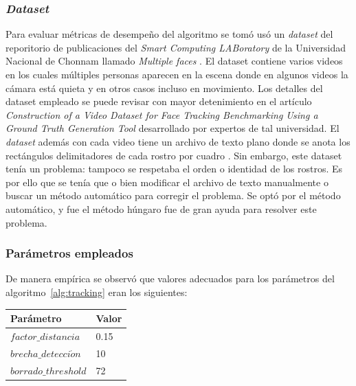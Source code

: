 \documentclass[a4paper,openright,12pt]{report}
\begin{document}
\subsubsection{\textit{Dataset}}
Para evaluar métricas de desempeño del algoritmo se tomó usó un \textit{dataset}
del reporitorio de publicaciones del \textit{Smart Computing LABoratory} de la
Universidad Nacional de Chonnam llamado \textit{Multiple faces}
\cite{chonnamDataset}. El dataset contiene varios
videos en los cuales múltiples personas aparecen en la escena donde en algunos
videos la cámara está quieta y en otros casos incluso en movimiento. Los
detalles del dataset empleado se puede revisar con mayor detenimiento en el
artículo \textit{Construction of a Video Dataset for Face Tracking Benchmarking
Using a Ground Truth Generation Tool} \cite{do2014construction} desarrollado por
expertos de tal universidad. El \textit{dataset} además con cada video tiene un
archivo de texto plano donde se anota los rectángulos delimitadores de cada
rostro por cuadro \cite{do2014construction}. Sin embargo, este dataset tenía un
problema: tampoco se respetaba el orden o identidad de los rostros. Es por
ello que se tenía que o bien modificar el archivo de texto manualmente o buscar
un método automático para corregir el problema. Se optó por el método
automático, y fue el método húngaro fue de gran ayuda para resolver este
problema.
\subsubsection{Parámetros empleados}
De manera empírica se observó que valores adecuados para los parámetros del
algoritmo~\ref{alg:tracking} eran los siguientes:
  \begin{center}
    \begin{longtable}{| p{} | p{} |}
    \hline

    \textbf{Parámetro} &
    \textbf{Valor}
    \\ \hline

    \textbf{$factor\_distancia$} &
    0.15
    \\ \hline

    \textbf{$brecha\_detecci\acute on$} &
    10
    \\ \hline

    \textbf{$borrado\_threshold$} &
    72
    \\ \hline

    \end{longtable}
  \end{center}
\end{document}
